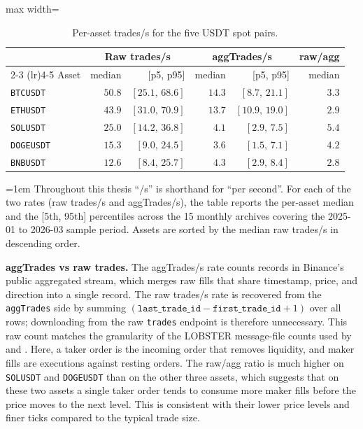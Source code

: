 \documentclass[11pt,titlepage,openany,oneside]{book}  %
\newcommand{\floatnote}[1]{%
  \par\smallskip\noindent%
  \begin{minipage}{\linewidth}%
    \footnotesize\emergencystretch=1em #1%
  \end{minipage}\par%
}
\begin{document}
\begin{table}[!htbp]
  \caption{Per-asset trades/s for the five USDT spot pairs.}
  \label{tab:trades-per-second}
  \begin{center}
    \begin{adjustbox}{max width=\textwidth}
    \begin{tabular}{lrrrrr}
      \toprule
            & \multicolumn{2}{c}{Raw trades/s} & \multicolumn{2}{c}{aggTrades/s} & raw/agg \\
      \cmidrule(lr){2-3} \cmidrule(lr){4-5}
      Asset & median & [p5, p95] & median & [p5, p95] & median \\
      \midrule
      \texttt{BTCUSDT}  & $50.8$ & $[25.1,\, 68.6]$ & $14.3$ & $[8.7,\, 21.1]$  & $3.3$ \\
      \texttt{ETHUSDT}  & $43.9$ & $[31.0,\, 70.9]$ & $13.7$ & $[10.9,\, 19.0]$ & $2.9$ \\
      \texttt{SOLUSDT}  & $25.0$ & $[14.2,\, 36.8]$ & $4.1$  & $[2.9,\, 7.5]$   & $5.4$ \\
      \texttt{DOGEUSDT} & $15.3$ & $[9.0,\, 24.5]$  & $3.6$  & $[1.5,\, 7.1]$   & $4.2$ \\
      \texttt{BNBUSDT}  & $12.6$ & $[8.4,\, 25.7]$  & $4.3$  & $[2.9,\, 8.4]$   & $2.8$ \\
      \bottomrule
    \end{tabular}
    \end{adjustbox}
  \end{center}
  \floatnote{Throughout this thesis ``/s'' is shorthand for ``per second''. For each of the two rates (raw trades/s and aggTrades/s), the table reports the per-asset median and the [5th, 95th] percentiles across the 15 monthly archives covering the 2025-01 to 2026-03 sample period. Assets are sorted by the median raw trades/s in descending order.}
\end{table}

\textbf{aggTrades vs raw trades.} The aggTrades/s rate counts records in Binance's public aggregated stream, which merges raw fills that share timestamp, price, and direction into a single record. The raw trades/s rate is recovered from the \texttt{aggTrades} side by summing $(\texttt{last\_trade\_id} - \texttt{first\_trade\_id} + 1)$ over all rows; downloading from the raw \texttt{trades} endpoint is therefore unnecessary. This raw count matches the granularity of the LOBSTER message-file counts used by \citet{shternshis2025predictability} and \citet{onofri2025emergence}. Here, a taker order is the incoming order that removes liquidity, and maker fills are executions against resting orders. The raw/agg ratio is much higher on \texttt{SOLUSDT} and \texttt{DOGEUSDT} than on the other three assets, which suggests that on these two assets a single taker order tends to consume more maker fills before the price moves to the next level. This is consistent with their lower price levels and finer ticks compared to the typical trade size.
\end{document}

